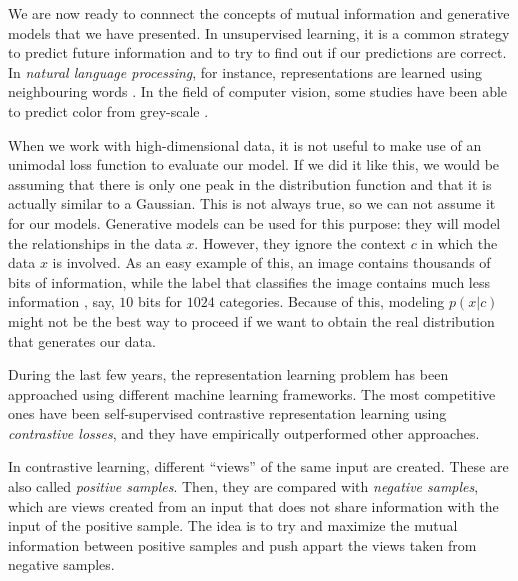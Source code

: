 

We are now ready to connnect the concepts of mutual information and generative models that we have presented. In unsupervised learning,
it is a common strategy to predict future information and to try to find out if our predictions are correct.
In \emph{natural language processing}, for instance, representations are learned 
using neighbouring words \citep{mikolov_efficient_2013}. In the field of computer vision, some studies have been able to predict color from grey-scale \citep{doersch_unsupervised_2016}.

When we work with high-dimensional data, it is not useful to make use of an unimodal loss function to evaluate our model. If we did it like this, we would be assuming that there is only
one peak in the distribution function and that it is actually similar to a Gaussian.  This is not always true, so we can not assume it for our models. Generative models can be used for this purpose:
they will model the relationships in the data $x$. However, they ignore the context $c$ in which the data $x$ is involved. As an easy example of this, an image contains thousands of bits of information,
while the label that classifies the image contains much less information , say, $10$ bits for $1024$ categories. Because of this, modeling $p(x|c)$ might not be the best way to proceed if we want
to obtain the real distribution that generates our data. 

During the last few years, the representation learning problem has been approached using different machine learning frameworks. The most competitive ones have been self-supervised contrastive representation learning \cite{oord_representation_2019,tian_what_2020,hjelm_learning_2019,gutmann_noise-contrastive_nodate,chen_simple_2020,he_momentum_2020} using \emph{contrastive losses}, and they have empirically outperformed other approaches.     

In contrastive learning, different ``views'' of the same input are created. These are also called \emph{positive samples}. Then, they are compared with \emph{negative samples}, which are views created from an input that does not share information with the input of the positive sample. The idea is to try and maximize the mutual information between positive samples and push appart the views taken from negative samples. 

